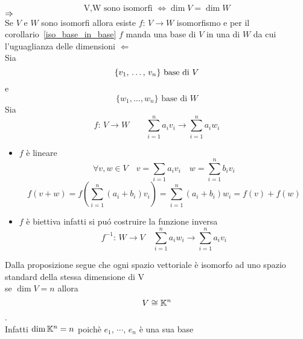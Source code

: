 \spazio
\begin{prop}\bianco
$$ \text{V,W sono isomorfi } \Leftrightarrow \dim V=\dim W$$
\proof $\Rightarrow$\\
Se $V$ e $W$ sono isomorfi allora esiste $f:\, V \to W$ isomorfismo e per il corollario~\ref{iso_base_in_base} $f$ manda una base di $V$ in una di $W$ da cui l'uguaglianza delle dimensioni
\proof $ \Leftarrow $\\
Sia $$\{ v_1, \, \dots , \, v_n \} \text{  base di } V$$ e
$$ \{ w_1, \dots , w_n \} \text{ base di } W $$
Sia $$f:\, V \to W \qquad \sum_{i=1}^n a_i v_i \to \sum_{i=1}^n a_i w_i  $$
\begin{itemize}
\item $f$ \`e lineare 
$$\forall v,w \in V\quad  v= \sum_{i=1} a_i v_i \quad w=\sum_{i=1}^n b_i v_i $$
$$ f(v+w) = f \left( \sum_{i=1}^n (a_i + b_i) v_i \right)= \sum_{i=1}^n (a_i+ b_i ) w_i = f(v) + f(w) $$
\item $f$ \`e biettiva infatti si pu\'o costruire la funzione inversa
$$ f^{-1}: \, W \to V \quad  \sum_{i=1}^n a_i w_i \to \sum_{i=1}^n a_i v_i $$
\end{itemize}
\endproof
\begin{oss} Dalla proposizione segue che ogni spazio vettoriale è isomorfo ad uno spazio standard della stessa dimensione di V\\  se $\dim V=n $ allora $$ V \cong \mathbb{K}^ n $$.\\
Infatti $\dim \mathbb{K}^ n  =  n $  poich\`e $e_1 , \, \cdots, \, e_n $ \`e una sua base
\end{oss}
\end{prop}
\newpage
